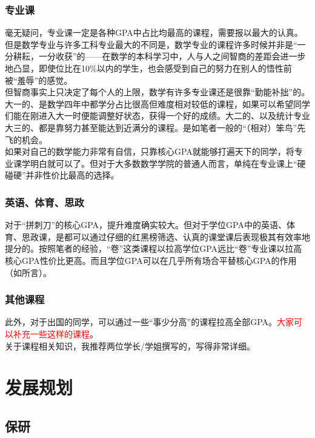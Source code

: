 \documentclass[a4paper,11pt,notitlepage]{article}
\newcommand{\todo}[1]{\textcolor{red}{#1}}
\begin{document}
\subsubsection{专业课}
毫无疑问，专业课一定是各种GPA中占比均最高的课程，需要报以最大的认真。但是数学专业与许多工科专业最大的不同是，数学专业的课程许多时候并非是“一分耕耘，一分收获”的——在数学的本科学习中，人与人之间智商的差距会进一步地凸显，即使位比在10\%以内的学生，也会感受到自己的努力在别人的悟性前被“羞辱”的感觉。\\
\indent 但智商事实上只决定了每个人的上限，数学有许多专业课还是很靠“勤能补拙”的。大一的、是数学四年中都学分占比很高但难度相对较低的课程，如果可以希望同学们能在刚进入大一时便能调整好状态，获得一个好的成绩。大二的、以及统计专业大三的、都是靠努力甚至能达到近满分的课程。是如笔者一般的“（相对）笨鸟”先飞的机会。\\
\indent 如果对自己的数学能力非常有自信，只靠核心GPA就能够打遍天下的同学，将专业课学明白就可以了。但对于大多数数学学院的普通人而言，单纯在专业课上“硬碰硬”并非性价比最高的选择。
\subsubsection{英语、体育、思政}
对于“拼刺刀”的核心GPA，提升难度确实较大。但对于学位GPA中的英语、体育、思政课，是都可以通过仔细的红黑榜筛选、认真的课堂课后表现极其有效率地提分的。按照笔者的经验，“卷”这类课程以拉高学位GPA远比“卷”专业课以拉高核心GPA性价比更高。而且学位GPA可以在几乎所有场合平替核心GPA的作用（如所言）。
\subsubsection{其他课程}\label{其他课程}
此外，对于出国的同学，可以通过一些“事少分高”的课程拉高全部GPA。\todo{大家可以补充一些这样的课程}。\\
\indent 关于课程相关知识，我推荐两位学长/学姐撰写的\cite{课程体系}，写得非常详细。

\section{发展规划}\label{发展规划}
\subsection{保研}\label{保研}
\end{document}
